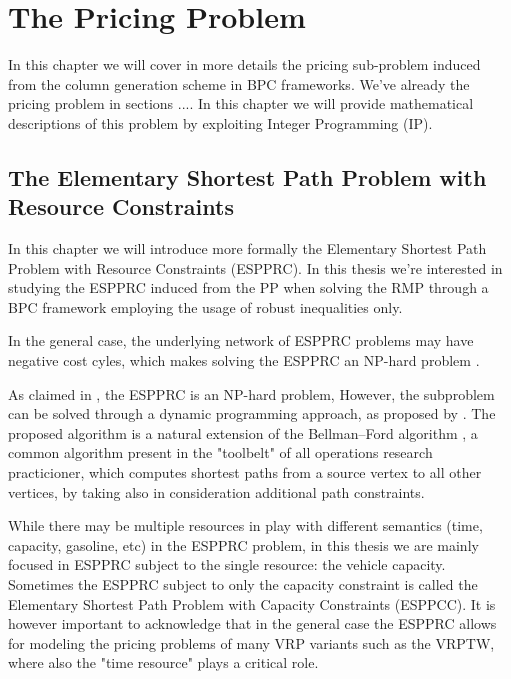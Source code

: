 \chapter{The Pricing Problem}
\label{sec:the-pricing-problem}


In this chapter we will cover in more details the pricing sub-problem
induced from the column generation scheme in BPC frameworks.
We've already the pricing problem in sections ....
In this chapter we will provide mathematical descriptions
of this problem by exploiting Integer Programming (IP).

\section{The Elementary Shortest Path Problem with Resource Constraints}
\label{sec:the-elementary-shortest-path-problem-with-resource-constraints}


In this chapter we will introduce more formally the Elementary Shortest Path Problem with Resource Constraints (ESPPRC).
In this thesis we're interested in studying the ESPPRC induced from the PP when solving the RMP through a BPC framework employing the usage of robust inequalities only.

In the general case, the underlying network of ESPPRC problems may have negative cost cyles, which makes solving the ESPPRC an NP-hard problem \parencite{dror1994}.

As claimed in \textcite{dror1994}, the ESPPRC is an NP-hard problem,
However, the subproblem can be solved through a dynamic programming approach, as proposed by \textcite{feillet2004}.
The proposed algorithm is a natural extension of the Bellman–Ford algorithm \parencite{bellman1958, fordjr1956},
a common algorithm present in the "toolbelt" of all operations research practicioner,
which computes shortest paths from a source vertex to all other vertices,
by taking also in consideration additional path constraints.

While there may be multiple resources in play with different semantics
(time, capacity, gasoline, etc)
in the ESPPRC problem,
in this thesis we are mainly focused in ESPPRC subject to the single resource: the vehicle capacity.
Sometimes the ESPPRC subject to only the capacity constraint is called the Elementary Shortest
Path Problem with Capacity Constraints (ESPPCC).
It is however important to acknowledge that in the general case the ESPPRC allows for modeling
the pricing problems of many VRP variants such as the VRPTW, where also the "time resource"
plays a critical role.

